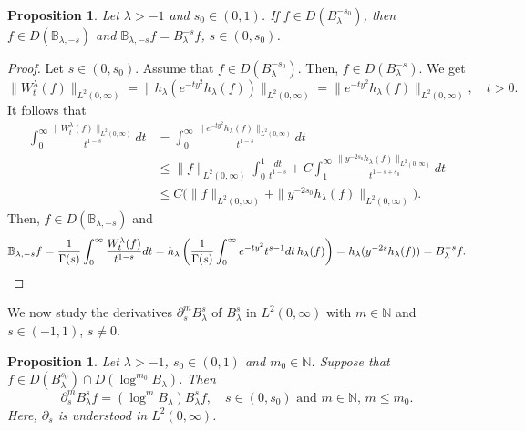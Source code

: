 \documentclass[10pt,a4paper]{amsart}
\newtheorem{prop}[thm]{Proposition}
\numberwithin{equation}{section}
\begin{document}
\begin{prop}\label{prop: Prop2.2}
 Let $\lambda >-1$ and $s_0\in (0,1)$. If $f\in D(B_\lambda^{-s_0})$, then $f\in D(\mathbb B_{\lambda ,-s})$ and $\mathbb B_{\lambda ,-s}f=B_\lambda^{-s}f$, $s\in (0,s_0)$.     
\end{prop}
\begin{proof}
    Let $s\in (0,s_0)$. Assume that $f\in D(B_\lambda^{-s_0})$. Then, $f\in D(B_\lambda^{-s})$. We get
\[
\|W_t^\lambda (f)\|_{L^2 (0,\infty)}=\|h_\lambda (e^{-ty^2}h_\lambda (f))\|_{L^2(0,\infty)}=\|e^{-ty^2}h_\lambda (f)\|_{L^2(0,\infty)},\quad t>0.
\]
It follows that
\begin{align*}
    \int_0^\infty \frac{\|W_t^\lambda (f)\|_{L^2(0,\infty)}}{t^{1-s}}dt&=\int_0^\infty \frac{\|e^{-ty^2}h_\lambda (f)\|_{L^2(0,\infty)}}{t^{1-s}}dt\\
    &\leq \|f\|_{L^2(0,\infty)}\int_0^1\frac{dt}{t^{1-s}}+C\int_1^\infty \frac{\|y^{-2s_0}h_\lambda (f)\|_{L^2(0,\infty)}}{t^{1-s+s_0}}dt\\
    &\leq C\Big(\|f\|_{L^2(0,\infty)}+\|y^{-2s_0}h_\lambda (f)\|_{L^2(0,\infty)}\Big).
\end{align*}
Then, $f\in D(\mathbb B_{\lambda ,-s})$ and 
\[
\mathbb B_{\lambda ,-s}f=\frac{1}{\Gamma (s)}\int_0^\infty \frac{W_t^\lambda (f)}{t^{1-s}}dt=h_\lambda \left(\frac{1}{\Gamma (s)}\int_0^\infty e^{-ty^2}t^{s-1}dt\,h_\lambda (f)\right)=h_\lambda (y^{-2s}h_\lambda (f))=B_\lambda^{-s}f.\qedhere
\]
\end{proof}
We now study the derivatives $\partial_s^m B_\lambda^s$ of $B_\lambda^s$ in $L^2(0,\infty)$ with $m\in \mathbb N$ and $s\in (-1,1)$, $s\neq 0$.

\begin{prop}\label{prop: Prop2.3}
    Let $\lambda >-1$, $s_0\in (0,1)$ and $m_0\in \mathbb N$. Suppose that $f\in D(B_\lambda^{s_0})\cap D(\log^{m_0}B_\lambda)$. Then
    \[
    \partial_s^m B_\lambda^sf=(\log^m B_\lambda)B_\lambda^sf,\quad s\in (0,s_0)\mbox{ and }m\in \mathbb N,\,m\leq m_0.
    \] 
 Here, $\partial_s$ is understood in $L^2(0,\infty)$.
\end{prop}
\end{document}

